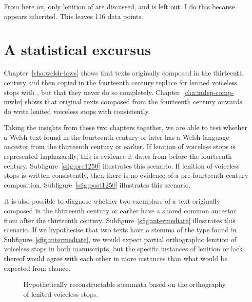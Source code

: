 From here on, only lenition of  are discussed, and  is left out. I do this because  appears inherited. This leaves 116 data points.

\section{A statistical excursus}
\label{sec:statistical-excursus}


Chapter~\ref{cha:welsh-laws} shows that texts originally composed in the thirteenth century and then copied in the fourteenth century replace  for lenited voiceless stops with , but that they never do so completely. Chapter~\ref{cha:indep-comp-mwbr} shows that original texts composed from the fourteenth century onwards do write lenited voiceless stops with  consistently.

Taking the insights from these two chapters together, we are able to test whether a Welsh text found in the fourteenth century or later has a Welsh-language ancestor from the thirteenth century or earlier. If lenition of voiceless stops is represented haphazardly, this is evidence it dates from before the fourteenth century. Subfigure~\ref{sfig:pre1250} illustrates this scenario. If lenition of voiceless stops is written consistently, then there is no evidence of a pre-fourteenth-century composition. Subfigure~\ref{sfig:post1250} illustrates this scenario.

It is also possible to diagnose whether two exemplars of a text originally composed in the thirteenth century or earlier have a shared common ancestor from after the thirteenth century. Subfigure~\ref{sfig:intermediate} illustrates this scenario. If we hypothesise that two texts have a stemma of the type found in Subfigure~\ref{sfig:intermediate}, we would expect partial orthographic lenition of voiceless stops in both manuscripts, but the specific instances of lenition or lack thereof would agree with each other in more instances than what would be expected from chance.

\begin{figure}[h]
  \centering
  \subfloat[]{
    \label{sfig:pre1250}
    \begin{forest}
      [μ < 1250
      [X > 1300]
      [Y > 1300]]
    \end{forest}}
  \subfloat[]{
    \label{sfig:post1250}
    \begin{forest}
      [μ > 1300
      [X > 1300]
      [Y > 1300]]
    \end{forest}}
  \caption{Hypothetically reconstructable stemmata based on the orthography of lenited voiceless stops.}
  \label{fig:possiblestemmata}
\end{figure}

